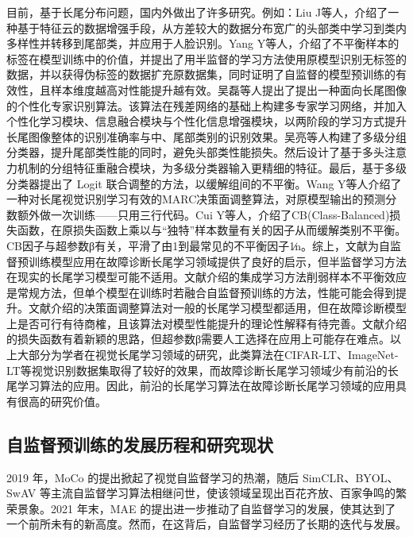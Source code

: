\documentclass[master]{thesis-uestc}
\begin{document}
目前，基于长尾分布问题，国内外做出了许多研究。例如：Liu J等人，介绍了一种基于特征云的数据增强手段，从方差较大的数据分布宽广的头部类中学习到类内多样性并转移到尾部类，并应用于人脸识别。Yang Y等人，介绍了不平衡样本的标签在模型训练中的价值，并提出了用半监督的学习方法使用原模型识别无标签的数据，并以获得伪标签的数据扩充原数据集，同时证明了自监督的模型预训练的有效性，且样本维度越高对性能提升越有效。吴磊等人提出了提出一种面向长尾图像的个性化专家识别算法。该算法在残差网络的基础上构建多专家学习网络，并加入个性化学习模块、信息融合模块与个性化信息增强模块，以两阶段的学习方式提升长尾图像整体的识别准确率与中、尾部类别的识别效果。吴亮等人构建了多级分组分类器，提升尾部类性能的同时，避免头部类性能损失。然后设计了基于多头注意力机制的分组特征重融合模块，为多级分类器输入更精细的特征。最后，基于多级分类器提出了 Logit 联合调整的方法，以缓解组间的不平衡。Wang Y等人介绍了一种对长尾视觉识别学习有效的MARC决策面调整算法，对原模型输出的预测分数额外做一次训练——只用三行代码。Cui Y等人，介绍了CB(Class-Balanced)损失函数，在原损失函数上乘以与“独特”样本数量有关的因子从而缓解类别不平衡。CB因子与超参数β有关，平滑了由1到最常见的不平衡因子1∕n。综上，文献\cite{yang2020rethinking}为自监督预训练模型应用在故障诊断长尾学习领域提供了良好的启示，但半监督学习方法在现实的长尾学习模型可能不适用。文献\cite{wu2023personalized,吴亮2023基于多级学习的长尾分布下交通多目标检测}介绍的集成学习方法削弱样本不平衡效应是常规方法，但单个模型在训练时若融合自监督预训练的方法，性能可能会得到提升。文献\cite{wang2023margin}介绍的决策面调整算法对一般的长尾学习模型都适用，但在故障诊断模型上是否可行有待商榷，且该算法对模型性能提升的理论性解释有待完善。文献\cite{cui2019class}介绍的损失函数有着新颖的思路，但超参数β需要人工选择在应用上可能存在难点。以上大部分为学者在视觉长尾学习领域的研究，此类算法在CIFAR-LT、ImageNet-LT等视觉识别数据集取得了较好的效果，而故障诊断长尾学习领域少有前沿的长尾学习算法的应用。因此，前沿的长尾学习算法在故障诊断长尾学习领域的应用具有很高的研究价值。

\subsection{自监督预训练的发展历程和研究现状}

2019 年，MoCo 的提出掀起了视觉自监督学习的热潮，随后 SimCLR、BYOL、SwAV 等主流自监督学习算法相继问世，使该领域呈现出百花齐放、百家争鸣的繁荣景象。2021 年末，MAE 的提出进一步推动了自监督学习的发展，使其达到了一个前所未有的新高度。然而，在这背后，自监督学习经历了长期的迭代与发展。
\end{document}
